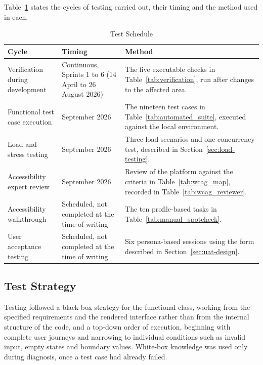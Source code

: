 \documentclass[12pt, oneside]{article} %
\begin{document}
Table~\ref{tab:test_schedule} states the cycles of testing carried out, their timing and the method used in each.

\begin{table}[H]
\caption{Test Schedule}
\label{tab:test_schedule}
\vspace{-4mm}
\begin{center}
\renewcommand{\arraystretch}{1.2}
\footnotesize
\begin{tabular}{|>{\raggedright\arraybackslash}p{3.3cm}|>{\raggedright\arraybackslash}p{3.4cm}|>{\raggedright\arraybackslash}p{6.6cm}|}
\hline
\textbf{Cycle} & \textbf{Timing} & \textbf{Method} \\
\hline \hline
Verification during development & Continuous, Sprints 1 to 6 (14 April to 26 August 2026) & The five executable checks in Table~\ref{tab:verification}, run after changes to the affected area. \\ \hline
Functional test case execution & 3 September 2026 & The nineteen test cases in Table~\ref{tab:automated_suite}, executed against the local environment. \\ \hline
Load and stress testing & 3 September 2026 & Three load scenarios and one concurrency test, described in Section~\ref{sec:load-testing}. \\ \hline
Accessibility expert review & 3 September 2026 & Review of the platform against the criteria in Table~\ref{tab:wcag_map}, recorded in Table~\ref{tab:wcag_reviewer}. \\ \hline
Accessibility walkthrough & Scheduled, not completed at the time of writing & The ten profile-based tasks in Table~\ref{tab:manual_spotcheck}. \\ \hline
User acceptance testing & Scheduled, not completed at the time of writing & Six persona-based sessions using the form described in Section~\ref{sec:uat-design}. \\ \hline
\end{tabular}
\end{center}
\end{table}

\subsection{Test Strategy}

Testing followed a black-box strategy for the functional class, working from the specified requirements and the rendered interface rather than from the internal structure of the code, and a top-down order of execution, beginning with complete user journeys and narrowing to individual conditions such as invalid input, empty states and boundary values. White-box knowledge was used only during diagnosis, once a test case had already failed.
\end{document}
